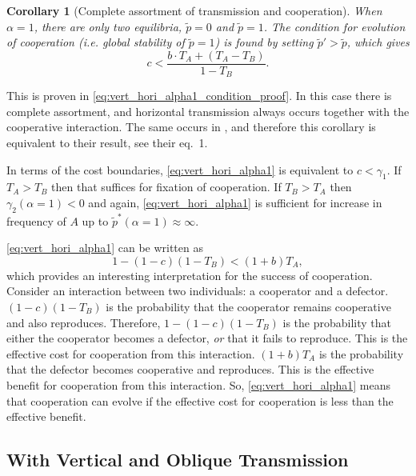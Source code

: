 \documentclass[12pt]{extarticle}
\newtheorem{corollary}{Corollary}
\begin{document}
{\begin{corollary}[Complete assortment of transmission and cooperation]
When $\alpha=1$, there are only two equilibria, $\tilde{p}=0$ and $\tilde{p}=1$.
The condition for evolution of cooperation (i.e. global stability of $\tilde{p}=1$) is found by setting $\tilde{p}'>\tilde{p}$, which gives
\begin{equation}\label{eq:vert_hori_alpha1}
c < \frac{b \cdot T_A + (T_A - T_B)}{1-T_B}.
\end{equation}
\end{corollary}
This is proven in \autoref{eq:vert_hori_alpha1_condition_proof}.
In this case there is complete assortment, and horizontal transmission always occurs together with the cooperative interaction. The same occurs in \citet{lewin2017microbes}, and therefore this corollary is equivalent to their result, see their eq.~1.

In terms of the cost boundaries, \autoref{eq:vert_hori_alpha1} is equivalent to $c<\gamma_1$. If $T_A>T_B$ then that suffices for fixation of cooperation. If $T_B>T_A$ then $\gamma_2(\alpha=1)<0$ and again, \autoref{eq:vert_hori_alpha1} is sufficient for increase in frequency of $A$ up to $\tilde{p}^*(\alpha=1) \approx \infty$.

\autoref{eq:vert_hori_alpha1} can be written as
\begin{equation} \label{eq:vert_hori_alpha1_effective}
1 - (1-c)(1-T_B) < (1+b) T_A ,
\end{equation}
which provides an interesting interpretation for the success of cooperation. 
Consider an interaction between two individuals: a cooperator and a defector.
$(1-c)(1-T_B)$ is the probability that the cooperator remains cooperative and also reproduces. 
Therefore, $1 - (1-c)(1-T_B)$ is the probability that either the cooperator becomes a defector, \emph{or} that it fails to reproduce.
This is the effective cost for cooperation from this interaction.
$(1+b) T_A$ is the probability that the defector becomes cooperative and reproduces.
This is the effective benefit for cooperation from this interaction.
So, \autoref{eq:vert_hori_alpha1} means that cooperation can evolve if the effective cost for cooperation is less than the effective benefit.



\subsection*{With Vertical and Oblique Transmission}

}
\end{document}
